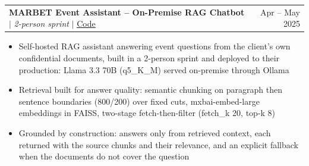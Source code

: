 \documentclass[letterpaper,11pt]{article}
\makeatletter
\newcommand{\resumeItem}[1]{
  \item\small{#1 \vspace{-2pt}}
}
\newcommand{\resumeProjectHeading}[2]{
    \item
    \begin{tabular*}{0.97\textwidth}{l@{\extracolsep{\fill}}r}
      \small#1 & #2 \\
    \end{tabular*}\vspace{-7pt}
}
\newcommand{\resumeItemListStart}{\begin{itemize}}
\newcommand{\resumeItemListEnd}{\end{itemize}\vspace{-5pt}}
\makeatother
\begin{document}
    \resumeProjectHeading
      {\textbf{MARBET Event Assistant -- On-Premise RAG Chatbot} $|$ \emph{2-person sprint} $|$ \href{https://github.com/alex-krasnoshtanov/MARBET-Chatbot}{\underline{Code}}}{Apr -- May 2025}
      \resumeItemListStart
        \resumeItem{Self-hosted RAG assistant answering event questions from the client's own confidential documents, built in a 2-person sprint and deployed to their production: Llama 3.3 70B (q5\_K\_M) served on-premise through Ollama}
        \resumeItem{Retrieval built for answer quality: semantic chunking on paragraph then sentence boundaries (800/200) over fixed cuts, mxbai-embed-large embeddings in FAISS, two-stage fetch-then-filter (fetch\_k 20, top-k 8)}
        \resumeItem{Grounded by construction: answers only from retrieved context, each returned with the source chunks and their relevance, and an explicit fallback when the documents do not cover the question}
      \resumeItemListEnd
\end{document}
